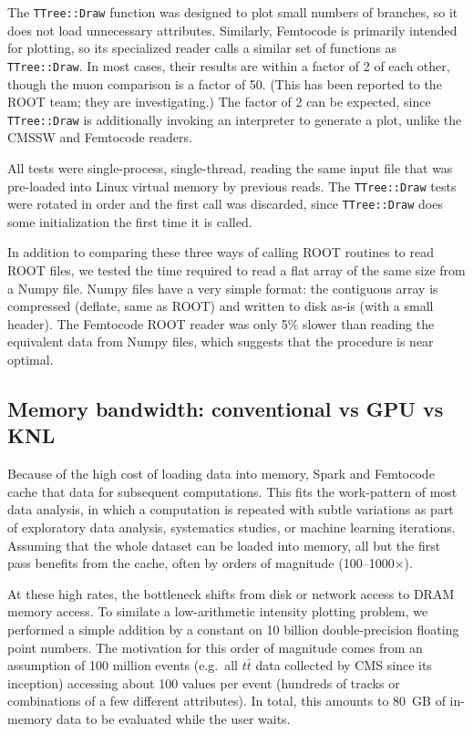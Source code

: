 \documentclass[12pt]{article}
\begin{document}
The {\tt TTree::Draw} function was designed to plot small numbers of branches, so it does not load unnecessary attributes. Similarly, Femtocode is primarily intended for plotting, so its specialized reader calls a similar set of functions as {\tt TTree::Draw}. In most cases, their results are within a factor of 2 of each other, though the muon comparison is a factor of 50. (This has been reported to the ROOT team; they are investigating.) The factor of 2 can be expected, since {\tt TTree::Draw} is additionally invoking an interpreter to generate a plot, unlike the CMSSW and Femtocode readers.

All tests were single-process, single-thread, reading the same input file that was pre-loaded into Linux virtual memory by previous reads. The {\tt TTree::Draw} tests were rotated in order and the first call was discarded, since {\tt TTree::Draw} does some initialization the first time it is called.

In addition to comparing these three ways of calling ROOT routines to read ROOT files, we tested the time required to read a flat array of the same size from a Numpy file. Numpy files have a very simple format: the contiguous array is compressed (deflate, same as ROOT) and written to disk as-is (with a small header). The Femtocode ROOT reader was only 5\% slower than reading the equivalent data from Numpy files, which suggests that the procedure is near optimal.

\subsection*{Memory bandwidth: conventional vs GPU vs KNL}

Because of the high cost of loading data into memory, Spark and Femtocode cache that data for subsequent computations. This fits the work-pattern of most data analysis, in which a computation is repeated with subtle variations as part of exploratory data analysis, systematics studies, or machine learning iterations. Assuming that the whole dataset can be loaded into memory, all but the first pass benefits from the cache, often by orders of magnitude (100--1000$\times$).

At these high rates, the bottleneck shifts from disk or network access to DRAM memory access. To similate a low-arithmetic intensity plotting problem, we performed a simple addition by a constant on 10 billion double-precision floating point numbers. The motivation for this order of magnitude comes from an assumption of 100 million events (e.g.\ all $t\bar{t}$ data collected by CMS since its inception) accessing about 100 values per event (hundreds of tracks or combinations of a few different attributes). In total, this amounts to 80~GB of in-memory data to be evaluated while the user waits.
\end{document}
